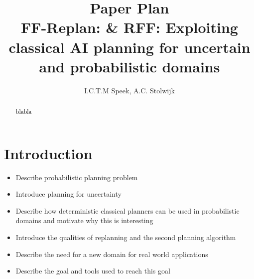 \documentclass[runningheads,a4paper]{llncs}
\begin{document}
\mainmatter%

\title{Paper Plan\\
FF-Replan: \& RFF\@: Exploiting classical AI planning for uncertain and probabilistic domains}


\author{I.C.T.M Speek, A.C. Stolwijk}

%



\maketitle


\begin{abstract}
blabla
\end{abstract}


\section{Introduction}

\begin{itemize}
	\item Describe probabilistic planning problem
	\item Introduce planning for uncertainty
	\item Describe how deterministic classical planners can be used in probabilistic domains and motivate why this is interesting
	\item Introduce the qualities of replanning and the second planning algorithm
	\item Describe the need for a new domain for real world applications
	\item Describe the goal and tools used to reach this goal
\end{itemize}
\end{document}
